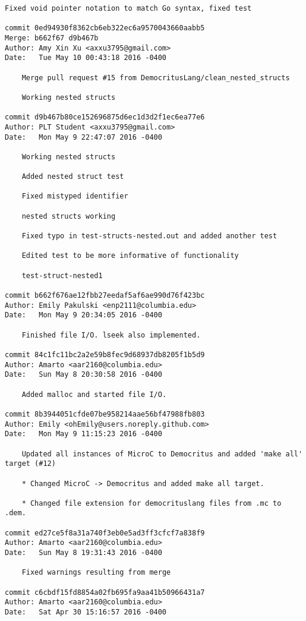 \begin{lstlisting}[backgroundcolor=\color{white}]
    Fixed void pointer notation to match Go syntax, fixed test

commit 0ed94930f8362cb6eb322ec6a9570043660aabb5
Merge: b662f67 d9b467b
Author: Amy Xin Xu <axxu3795@gmail.com>
Date:   Tue May 10 00:43:18 2016 -0400

    Merge pull request #15 from DemocritusLang/clean_nested_structs
    
    Working nested structs

commit d9b467b80ce152696875d6ec1d3d2f1ec6ea77e6
Author: PLT Student <axxu3795@gmail.com>
Date:   Mon May 9 22:47:07 2016 -0400

    Working nested structs
    
    Added nested struct test
    
    Fixed mistyped identifier
    
    nested structs working
    
    Fixed typo in test-structs-nested.out and added another test
    
    Edited test to be more informative of functionality
    
    test-struct-nested1

commit b662f676ae12fbb27eedaf5af6ae990d76f423bc
Author: Emily Pakulski <enp2111@columbia.edu>
Date:   Mon May 9 20:34:05 2016 -0400

    Finished file I/O. lseek also implemented.

commit 84c1fc11bc2a2e59b8fec9d68937db8205f1b5d9
Author: Amarto <aar2160@columbia.edu>
Date:   Sun May 8 20:30:58 2016 -0400

    Added malloc and started file I/O.

commit 8b3944051cfde07be958214aae56bf47988fb803
Author: Emily <ohEmily@users.noreply.github.com>
Date:   Mon May 9 11:15:23 2016 -0400

    Updated all instances of MicroC to Democritus and added 'make all' target (#12)
    
    * Changed MicroC -> Democritus and added make all target.
    
    * Changed file extension for democrituslang files from .mc to .dem.

commit ed27ce5f8a31a740f3eb0e5ad3ff3cfcf7a838f9
Author: Amarto <aar2160@columbia.edu>
Date:   Sun May 8 19:31:43 2016 -0400

    Fixed warnings resulting from merge

commit c6cbdf15fd8854a02fb695fa9aa41b50966431a7
Author: Amarto <aar2160@columbia.edu>
Date:   Sat Apr 30 15:16:57 2016 -0400


\end{lstlisting}
